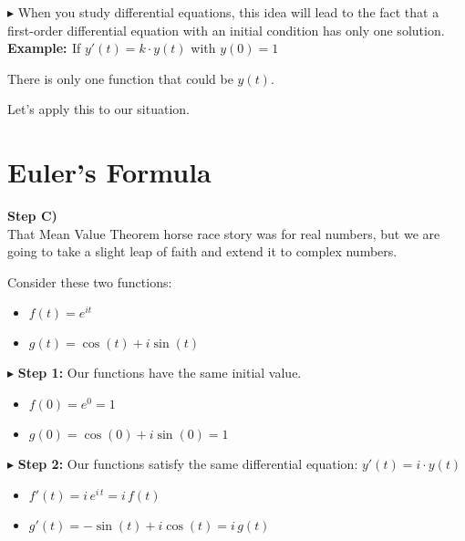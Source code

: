 \documentclass{ximera}
\begin{document}
$\blacktriangleright$  When you study differential equations, this idea will lead to the fact that a first-order differential equation with an initial condition has only one solution. \\

\textbf{\textcolor{blue!55!black}{Example: }} If $y'(t) = k \cdot y(t)$ with $y(0)=1$


There is only one function that could be $y(t)$.

Let's apply this to our situation. \\















\section{Euler's Formula}


\textbf{\textcolor{purple!85!blue}{Step C)}} \\


That Mean Value Theorem horse race story was for real numbers, but we are going to take a slight leap of faith and extend it to complex numbers.




Consider these two functions:


\begin{itemize}
	\item $f(t) = e^{i t}$
	\item $g(t) = \cos(t) + i \sin(t)$
\end{itemize}




$\blacktriangleright$   \textbf{Step 1:} Our functions have the same initial value.

\begin{itemize}
	\item $f(0) = e^0 = 1$
	\item $g(0) = \cos(0) + i \sin(0) = 1$
\end{itemize}





$\blacktriangleright$   \textbf{Step 2:} Our functions satisfy the same differential equation: $y'(t) = i \cdot y(t)$



\begin{itemize}
	\item $f'(t) = i \, e^{i \, t} = i \, f(t)$
	\item $g'(t) = -\sin(t) + i \cos(t) = i \, g(t)$
\end{itemize}
\end{document}
